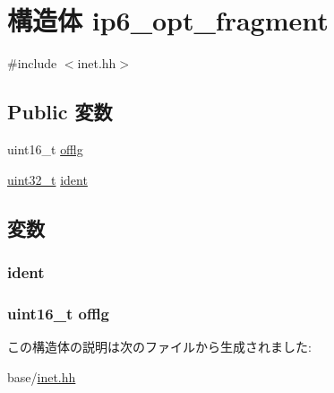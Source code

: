 \hypertarget{structNet_1_1ip6__opt__fragment}{
\section{構造体 ip6\_\-opt\_\-fragment}
\label{structNet_1_1ip6__opt__fragment}
}


{\ttfamily \#include $<$inet.hh$>$}\subsection*{Public 変数}
\begin{DoxyCompactItemize}
\item 
uint16\_\-t \hyperlink{structNet_1_1ip6__opt__fragment_a7062f9d68a633bff5bf72880711ddfed}{offlg}
\item 
\hyperlink{Type_8hh_a435d1572bf3f880d55459d9805097f62}{uint32\_\-t} \hyperlink{structNet_1_1ip6__opt__fragment_ade289faa01a0cab7f7b9b2727cee6c34}{ident}
\end{DoxyCompactItemize}


\subsection{変数}
\hypertarget{structNet_1_1ip6__opt__fragment_ade289faa01a0cab7f7b9b2727cee6c34}{
\subsubsection[{ident}]{ {\bf ident}}}
\label{structNet_1_1ip6__opt__fragment_ade289faa01a0cab7f7b9b2727cee6c34}
\hypertarget{structNet_1_1ip6__opt__fragment_a7062f9d68a633bff5bf72880711ddfed}{
\subsubsection[{offlg}]{\setlength{\rightskip}{0pt plus 5cm}uint16\_\-t {\bf offlg}}}
\label{structNet_1_1ip6__opt__fragment_a7062f9d68a633bff5bf72880711ddfed}


この構造体の説明は次のファイルから生成されました:\begin{DoxyCompactItemize}
\item 
base/\hyperlink{inet_8hh}{inet.hh}\end{DoxyCompactItemize}
